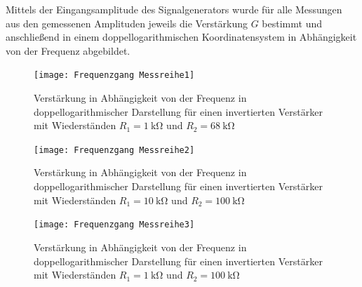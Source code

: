 Mittels der Eingangsamplitude des Signalgenerators wurde für alle Messungen aus den gemessenen Amplituden jeweils die Verstärkung $G$ bestimmt und anschließend in einem doppellogarithmischen Koordinatensystem in Abhängigkeit von der Frequenz abgebildet. 
\begin{figure}
\centering
\texttt{[image: Frequenzgang Messreihe1]}
\label{fig:invert freq 1}
\caption{Verstärkung in Abhängigkeit von der Frequenz in doppellogarithmischer Darstellung für einen invertierten Verstärker mit Wiederständen $R_1=\SI{1}{\kilo\ohm}$ und $R_2=\SI{68}{\kilo\ohm}$}
\end{figure}
\begin{figure}
\centering
\texttt{[image: Frequenzgang Messreihe2]}
\label{fig:invert freq 2}
\caption{Verstärkung in Abhängigkeit von der Frequenz in doppellogarithmischer Darstellung für einen invertierten Verstärker mit Wiederständen $R_1=\SI{10}{\kilo\ohm}$ und $R_2=\SI{100}{\kilo\ohm}$}
\end{figure}
\begin{figure}
\centering
\texttt{[image: Frequenzgang Messreihe3]}
\label{fig:invert freq 3}
\caption{Verstärkung in Abhängigkeit von der Frequenz in doppellogarithmischer Darstellung für einen invertierten Verstärker mit Wiederständen $R_1=\SI{1}{\kilo\ohm}$ und $R_2=\SI{100}{\kilo\ohm}$}
\end{figure}
